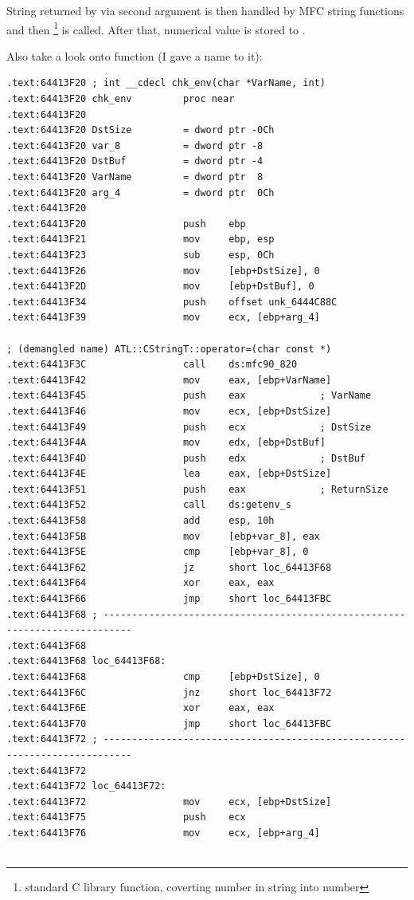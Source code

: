 {String returned by  via second argument is then handled by MFC string functions and then 
\footnote{standard C library function, coverting number in string into number} is called. 
After that, numerical value is stored to }.

{Also take a look onto  function (I gave a name to it)}:

\begin{lstlisting}
.text:64413F20 ; int __cdecl chk_env(char *VarName, int)
.text:64413F20 chk_env         proc near
.text:64413F20
.text:64413F20 DstSize         = dword ptr -0Ch
.text:64413F20 var_8           = dword ptr -8
.text:64413F20 DstBuf          = dword ptr -4
.text:64413F20 VarName         = dword ptr  8
.text:64413F20 arg_4           = dword ptr  0Ch
.text:64413F20
.text:64413F20                 push    ebp
.text:64413F21                 mov     ebp, esp
.text:64413F23                 sub     esp, 0Ch
.text:64413F26                 mov     [ebp+DstSize], 0
.text:64413F2D                 mov     [ebp+DstBuf], 0
.text:64413F34                 push    offset unk_6444C88C
.text:64413F39                 mov     ecx, [ebp+arg_4]

; (demangled name) ATL::CStringT::operator=(char const *)
.text:64413F3C                 call    ds:mfc90_820 
.text:64413F42                 mov     eax, [ebp+VarName]
.text:64413F45                 push    eax             ; VarName
.text:64413F46                 mov     ecx, [ebp+DstSize]
.text:64413F49                 push    ecx             ; DstSize
.text:64413F4A                 mov     edx, [ebp+DstBuf]
.text:64413F4D                 push    edx             ; DstBuf
.text:64413F4E                 lea     eax, [ebp+DstSize]
.text:64413F51                 push    eax             ; ReturnSize
.text:64413F52                 call    ds:getenv_s
.text:64413F58                 add     esp, 10h
.text:64413F5B                 mov     [ebp+var_8], eax
.text:64413F5E                 cmp     [ebp+var_8], 0
.text:64413F62                 jz      short loc_64413F68
.text:64413F64                 xor     eax, eax
.text:64413F66                 jmp     short loc_64413FBC
.text:64413F68 ; ---------------------------------------------------------------------------
.text:64413F68
.text:64413F68 loc_64413F68:
.text:64413F68                 cmp     [ebp+DstSize], 0
.text:64413F6C                 jnz     short loc_64413F72
.text:64413F6E                 xor     eax, eax
.text:64413F70                 jmp     short loc_64413FBC
.text:64413F72 ; ---------------------------------------------------------------------------
.text:64413F72
.text:64413F72 loc_64413F72:
.text:64413F72                 mov     ecx, [ebp+DstSize]
.text:64413F75                 push    ecx
.text:64413F76                 mov     ecx, [ebp+arg_4]


\end{lstlisting}
